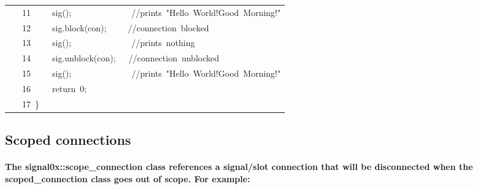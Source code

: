 \documentclass[9pt,onside,a4paper]{article}
\newcommand{\hlstd}[1]{\textcolor[rgb]{0.2,0,0.4}{#1}}
\newcommand{\hlnum}[1]{\textcolor[rgb]{0.2,0.73,0.02}{#1}}
\newcommand{\hlslc}[1]{\textcolor[rgb]{0,0.4,0.2}{#1}}
\newcommand{\hlopt}[1]{\textcolor[rgb]{0.33,0.33,0.33}{#1}}
\newcommand{\hllin}[1]{\textcolor[rgb]{0.6,0.6,0.6}{#1}}
\newcommand{\hlkwa}[1]{\textcolor[rgb]{1,0.19,0.19}{#1}}
\newcommand{\hlkwd}[1]{\textcolor[rgb]{0.82,0.11,0.93}{#1}}
\begin{document}
\begin{center}
\begin{xtabular}{||l||}
\hllin{\ \ \ 11\ }\hlstd{}\hlstd{\ \ \ \ }\hlstd{}\hlkwd{sig}\hlstd{}\hlopt{();}\hlstd{\ \ \ \ \ \ \ \ \ \ \ \ \ \ }\hlopt{}\hlstd{}\hlslc{//prints\ "Hello\ World!Good\ Morning!"}\\
\hllin{\ \ \ 12\ }\hlstd{}\hlstd{\ \ \ \ }\hlstd{sig}\hlopt{.}\hlstd{}\hlkwd{block}\hlstd{}\hlopt{(}\hlstd{con}\hlopt{);}\hlstd{\ \ \ \ \ }\hlopt{}\hlstd{}\hlslc{//connection\ blocked}\\
\hllin{\ \ \ 13\ }\hlstd{}\hlstd{\ \ \ \ }\hlstd{}\hlkwd{sig}\hlstd{}\hlopt{();}\hlstd{\ \ \ \ \ \ \ \ \ \ \ \ \ \ }\hlopt{}\hlstd{}\hlslc{//prints\ nothing}\\
\hllin{\ \ \ 14\ }\hlstd{}\hlstd{\ \ \ \ }\hlstd{sig}\hlopt{.}\hlstd{}\hlkwd{unblock}\hlstd{}\hlopt{(}\hlstd{con}\hlopt{);}\hlstd{\ \ \ }\hlopt{}\hlstd{}\hlslc{//connection\ unblocked}\\
\hllin{\ \ \ 15\ }\hlstd{}\hlstd{\ \ \ \ }\hlstd{}\hlkwd{sig}\hlstd{}\hlopt{();}\hlstd{\ \ \ \ \ \ \ \ \ \ \ \ \ \ }\hlopt{}\hlstd{}\hlslc{//prints\ "Hello\ World!Good\ Morning!"}\\
\hllin{\ \ \ 16\ }\hlstd{}\hlstd{\ \ \ \ }\hlstd{}\hlkwa{return\ }\hlstd{}\hlnum{0}\hlstd{}\hlopt{;}\\
\hllin{\ \ \ 17\ }\hlstd{}\hlopt{\}}\hlstd{}\\
\hline
\end{xtabular}
\end{center}
\normalfont
\normalsize






\subsection{Scoped connections}
\paragraph{The signal0x::scope\_connection class references a signal/slot connection that will be disconnected when the
    scoped\_connection class goes out of scope. For example:}
\end{document}
